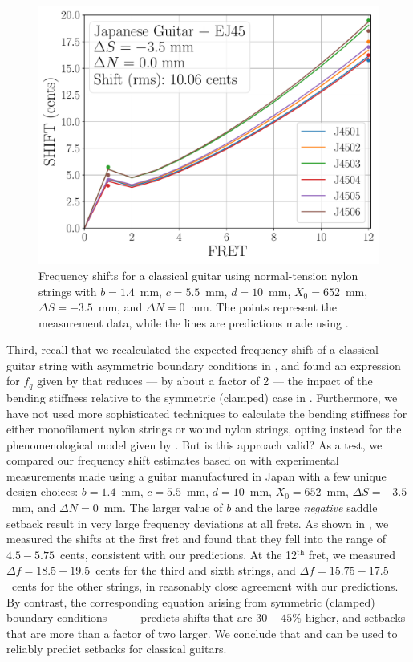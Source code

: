 \begin{figure}
  \centering
  \includegraphics[width=5.0in]{figures/japan_guitar_ej45_shifts}
  \caption{\label{fig:japan_guitar_ej45_shifts} Frequency shifts for a classical guitar using normal-tension nylon strings with $b = 1.4$~mm, $c = 5.5$~mm, $d = 10$~mm, $X_0 = 652$~mm, $\Delta S = -3.5$~mm, and $\Delta N = 0$~mm. The points represent the measurement data, while the lines are predictions made using .}
\end{figure}

Third, recall that we recalculated the expected frequency shift of a classical guitar string with asymmetric boundary conditions in , and found an expression for $f_q$ given by  that reduces --- by about a factor of 2 --- the impact of the bending stiffness relative to the symmetric (clamped) case in . Furthermore, we have not used more sophisticated techniques to calculate the bending stiffness for either monofilament nylon strings or wound nylon strings, opting instead for the phenomenological model given by . But is this approach valid? As a test, we compared our frequency shift estimates based on  with experimental measurements made using a guitar manufactured in Japan with a few unique design choices: $b = 1.4$~mm, $c = 5.5$~mm, $d = 10$~mm, $X_0 = 652$~mm, $\Delta S = -3.5$~mm, and $\Delta N = 0$~mm. The larger value of $b$ and the large \emph{negative} saddle setback result in very large frequency deviations at all frets. As shown in , we measured the shifts at the first fret and found that they fell into the range of $4.5 - 5.75$~cents, consistent with our predictions. At the 12$^\mathrm{th}$ fret, we measured $\Delta f = 18.5 - 19.5$~cents for the third and sixth strings, and $\Delta f = 15.75 - 17.5$~cents for the other strings, in reasonably close agreement with our predictions. By contrast, the corresponding equation arising from symmetric (clamped) boundary conditions ---  --- predicts shifts that are $30 - 45$\% higher, and setbacks that are more than a factor of two larger. We conclude that  and  can be used to reliably predict setbacks for classical guitars.

